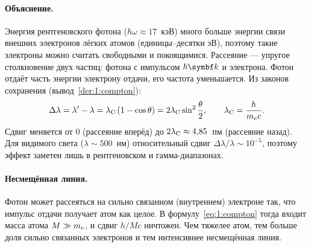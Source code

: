 \paragraph{Объяснение.} Энергия рентгеновского фотона ($\hbar\omega\approx17$~кэВ) много больше
энергии связи внешних электронов лёгких атомов (единицы--десятки эВ), поэтому такие электроны
можно считать свободными и покоящимися. Рассеяние — упругое столкновение двух частиц:
фотона с импульсом $\hbar\vect k$ и электрона. Фотон отдаёт часть энергии электрону отдачи,
его частота уменьшается. Из законов сохранения (вывод~\ref{der:1:compton}):
\begin{equation}\label{eq:1:compton}
  \Delta\lambda=\lambda'-\lambda=\lambda_{\mathrm C}\,(1-\cos\theta)=2\lambda_{\mathrm C}\sin^2\frac{\theta}{2},\qquad
  \lambda_{\mathrm C}=\frac{h}{m_e c}.
\end{equation}
Сдвиг меняется от 0 (рассеяние вперёд) до $2\lambda_{\mathrm C}\approx4{,}85$~пм (рассеяние назад).
Для видимого света ($\lambda\sim500$~нм) относительный сдвиг $\Delta\lambda/\lambda\sim10^{-5}$,
поэтому эффект заметен лишь в рентгеновском и гамма-диапазонах.

\paragraph{Несмещённая линия.} Фотон может рассеяться на сильно связанном (внутреннем)
электроне так, что импульс отдачи получает атом как целое. В формулу~\eqref{eq:1:compton}
тогда входит масса атома $M\gg m_e$, и сдвиг $h/Mc$ ничтожен. Чем тяжелее атом, тем больше
доля сильно связанных электронов и тем интенсивнее несмещённая линия.

